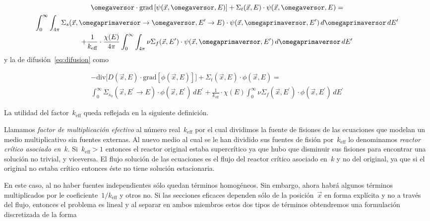 \begin{multline}
\label{eq:transportemm}
 \omegaversor \cdot \text{grad} \left[ \psi(\vec{x}, \omegaversor, E) \right]
 + \Sigma_t(\vec{x}, E) \cdot \psi(\vec{x}, \omegaversor, E) = \\
 \int_{0}^{\infty} \int_{4\pi} \Sigma_s(\vec{x}, \omegaprimaversor \rightarrow \omegaversor, E^\prime \rightarrow E) \cdot \psi(\vec{x}, \omegaprimaversor, E^\prime) \, d\omegaprimaversor \, dE^\prime \\
+ \frac{1}{k_\text{eff}} \cdot \frac{\chi(E)}{4\pi} \int_{0}^{\infty} \int_{4\pi} \nu\Sigma_f(\vec{x}, E^\prime) \cdot \psi(\vec{x}, \omegaprimaversor, E^\prime) \, d\omegaprimaversor \, dE^\prime 
\end{multline}
%
y la de difusión~\eqref{eq:difusion} como

\begin{multline}
\label{eq:difusionmm}
 - \text{div} \Big[ D(\vec{x}, E) \cdot \text{grad} \left[ \phi(\vec{x}, E) \right] \Big]
 + \Sigma_t(\vec{x}, E) \cdot \phi(\vec{x}, E)
 = \\
\int_{0}^{\infty} \Sigma_{s_0}(\vec{x}, E^{\prime} \rightarrow E)  \cdot \phi(\vec{x}, E^\prime) \, dE^\prime +
\frac{1}{k_\text{eff}} \cdot \chi(E) \int_{0}^{\infty} \nu\Sigma_f(\vec{x}, E^\prime) \cdot \phi(\vec{x}, E^\prime) \, dE^\prime
\end{multline}

La utilidad del factor~$k_\text{eff}$ queda reflejada en la siguiente definición.

\begin{definicion}
Llamamos \emph{factor de multiplicación efectivo} al número real~$k_\text{eff}$ por el cual dividimos la fuente de fisiones de las ecuaciones que modelan un medio multiplicativo sin fuentes externas. Al nuevo medio al cual se le han dividido sus fuentes de fisión por~$k_\text{eff}$ lo denominamos \emph{reactor crítico asociado en~$k$}. Si~$k_\text{eff}>1$ entonces el reactor original estaba supercrítico ya que hubo que disminuir sus fisiones para encontrar una solución no trivial, y viceversa. El flujo solución de las ecuaciones es el flujo del reactor crítico asociado en~$k$ y no del original, ya que si el original no estaba crítico entonces éste no tiene solución estacionaria.
\end{definicion}

En este caso, al no haber fuentes independientes sólo quedan términos homogéneos. Sin embargo, ahora habrá algunos términos multiplicados por le coeficiente~$1/k_\text{eff}$ y otros no. Si las secciones eficaces dependen sólo de la posición~$\vec{x}$ en forma explícita y no a través del flujo, entonces el problema es lineal y al separar en ambos miembros estos dos tipos de términos obtendremos una formulación discretizada de la forma

